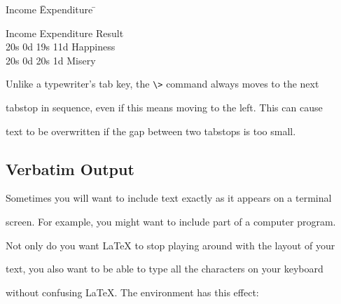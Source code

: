\egmid%

\begin{tabbing}

Income \=Expenditure \=    \kill

Income \>Expenditure \>Result \\

20s 0d \>19s 11d \>Happiness   \\

20s 0d \>20s 1d  \>Misery    \\

\end{tabbing}

\egend



Unlike a typewriter's tab key, the \verb|\>| command always moves to the next

tabstop in sequence, even if this means moving to the left.  This can cause

text to be overwritten if the gap between two tabstops is too small.



\subsection{Verbatim Output}



Sometimes you will want to include text exactly as it appears on a terminal

screen.  For example, you might want to include part of a computer program.

Not only do you want \LaTeX{} to stop playing around with the layout of your

text, you also want to be able to type all the characters on your keyboard

without confusing \LaTeX. The  environment has this effect:

\egstart

